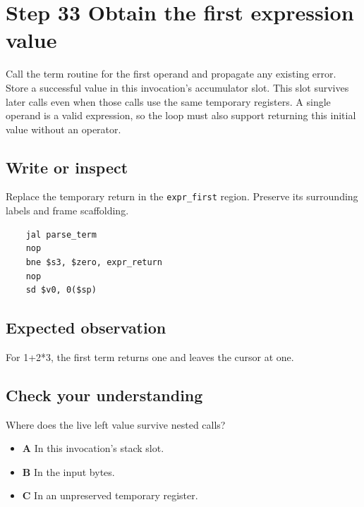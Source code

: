 \section{Step 33 Obtain the first expression value}\label{expression-s33}

Call the term routine for the first operand and propagate any existing error. Store a successful value in this invocation's accumulator slot. This slot survives later calls even when those calls use the same temporary registers. A single operand is a valid expression, so the loop must also support returning this initial value without an operator.

\subsection{Write or inspect}
Replace the temporary return in the \texttt{expr\_first} region. Preserve its surrounding labels and frame scaffolding.

\begin{verbatim}
    jal parse_term
    nop
    bne $s3, $zero, expr_return
    nop
    sd $v0, 0($sp)
\end{verbatim}
\subsection{Expected observation}
For 1+2*3, the first term returns one and leaves the cursor at one.

\subsection{Check your understanding}
Where does the live left value survive nested calls?

\begin{itemize}
  \item \textbf{A} In this invocation's stack slot.
  \item \textbf{B} In the input bytes.
  \item \textbf{C} In an unpreserved temporary register.
\end{itemize}
